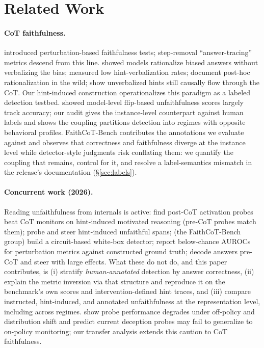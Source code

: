 \documentclass{article}
\begin{document}
\section{Related Work}
\label{sec:related}

\paragraph{CoT faithfulness.} \citet{lanham2023measuring} introduced perturbation-based faithfulness tests; step-removal ``answer-tracing'' metrics descend from this line. \citet{turpin2023language} showed models rationalize biased answers without verbalizing the bias; \citet{chen2025reasoning} measured low hint-verbalization rates; \citet{arcuschin2025wild} document post-hoc rationalization in the wild; \citet{zaman2026hint} show unverbalized hints still causally flow through the CoT. Our hint-induced construction operationalizes this paradigm as a labeled detection testbed. \citet{bentham2024disguised} showed model-level flip-based unfaithfulness scores largely track accuracy; our audit gives the instance-level counterpart against human labels and shows the coupling partitions detection into regimes with opposite behavioral profiles. FaithCoT-Bench \citep{shen2026faithcot} contributes the annotations we evaluate against and observes that correctness and faithfulness diverge at the instance level while detector-style judgments risk conflating them: we quantify the coupling that remains, control for it, and resolve a label-semantics mismatch in the release's documentation (\S\ref{sec:labels}).

\paragraph{Concurrent work (2026).} Reading unfaithfulness from internals is active: \citet{mirtaheri2026catching} find post-CoT activation probes beat CoT monitors on hint-induced motivated reasoning (pre-CoT probes match them); \citet{occhipinti2026probing} probe and steer hint-induced unfaithful spans; \citet{shen2026cie} (the FaithCoT-Bench group) build a circuit-based white-box detector; \citet{gurarieh2026bonafide} report below-chance AUROCs for perturbation metrics against constructed ground truth; \citet{cox2026decoding} decode answers pre-CoT and steer with large effects. What these do not do, and this paper contributes, is (i) stratify \emph{human-annotated} detection by answer correctness, (ii) explain the metric inversion via that structure and reproduce it on the benchmark's own scores and intervention-defined hint traces, and (iii) compare instructed, hint-induced, and annotated unfaithfulness at the representation level, including across regimes. \citet{offpolicy2025probes} show probe performance degrades under off-policy and distribution shift and predict current deception probes may fail to generalize to on-policy monitoring; our transfer analysis extends this caution to CoT faithfulness.
\end{document}
